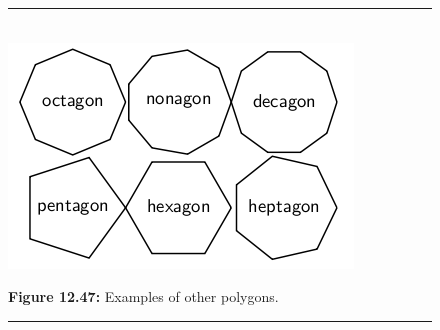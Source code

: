 {    \addtocounter{footnote}{-0}
    
        }%
      
    \par
  
        
    \setcounter{subfigure}{0}


	\begin{figure}[H] %
    \begin{center}
    \rule[.1in]{\figurerulewidth}{.005in} \\
        \label{m39368*uid93!!!underscore!!!media}\label{m39368*uid93!!!underscore!!!printimage}\includegraphics{col11306.imgs/m39368_MG10C13_046.png} %
        
      \vspace{2pt}
    \vspace{\rubberspace}\par \begin{cnxcaption}
	  \small \textbf{Figure 12.47: }Examples of other polygons.
	\end{cnxcaption}
      
    \vspace{.1in}
    \rule[.1in]{\figurerulewidth}{.005in} \\
        
    \end{center}

 \end{figure}   

    \addtocounter{footnote}{-0}
    
      \label{m39368*eip-210}
